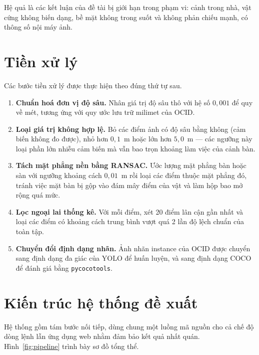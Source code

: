 Hệ quả là các kết luận của đề tài bị giới hạn trong phạm vi: cảnh trong nhà, vật cứng không biến
dạng, bề mặt không trong suốt và không phản chiếu mạnh, có thông số nội máy ảnh.

\section{Tiền xử lý}

Các bước tiền xử lý được thực hiện theo đúng thứ tự sau.

\begin{enumerate}[leftmargin=1.5cm]
\item \textbf{Chuẩn hoá đơn vị độ sâu.} Nhân giá trị độ sâu thô với hệ số $0{,}001$ để quy về
mét, tương ứng với quy ước lưu trữ milimet của OCID.
\item \textbf{Loại giá trị không hợp lệ.} Bỏ các điểm ảnh có độ sâu bằng không (cảm biến không
đo được), nhỏ hơn $0{,}1$~m hoặc lớn hơn $5{,}0$~m --- các ngưỡng này loại phần lớn nhiễu cảm
biến mà vẫn bao trọn khoảng làm việc của cảnh bàn.
\item \textbf{Tách mặt phẳng nền bằng RANSAC.} Ước lượng mặt phẳng bàn hoặc sàn với ngưỡng khoảng
cách $0{,}01$~m rồi loại các điểm thuộc mặt phẳng đó, tránh việc mặt bàn bị gộp vào đám mây điểm của vật và làm hộp bao mở rộng quá mức.
\item \textbf{Lọc ngoại lai thống kê.} Với mỗi điểm, xét 20 điểm lân cận gần nhất và loại các
điểm có khoảng cách trung bình vượt quá 2 lần độ lệch chuẩn của toàn tập.
\item \textbf{Chuyển đổi định dạng nhãn.} Ảnh nhãn instance của OCID được chuyển sang định dạng
đa giác của YOLO để huấn luyện, và sang định dạng COCO để đánh giá bằng \texttt{pycocotools}.
\end{enumerate}

\section{Kiến trúc hệ thống đề xuất}

Hệ thống gồm tám bước nối tiếp, dùng chung một luồng mã nguồn cho cả chế độ dòng lệnh lẫn ứng
dụng web nhằm đảm bảo kết quả nhất quán. Hình~\ref{fig:pipeline} trình bày sơ đồ tổng thể.

